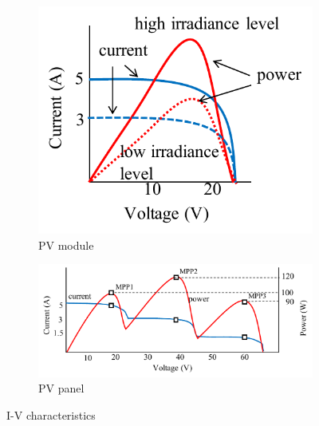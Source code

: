 \documentclass[conference]{IEEEtran}
\begin{document}
\begin{figure}
     \centering
    \begin{subfigure}[b]{0.5\linewidth}
        \centering
        \includegraphics[width=\linewidth]{fig/IV-module.pdf}
        \caption{PV module}
    \end{subfigure}
    \hfill
    \begin{subfigure}[b]{0.9\linewidth}
        \centering
        \vspace{3mm}
        \includegraphics[width=\linewidth]{fig/IV-panel.pdf}
        \caption{PV panel}
    \end{subfigure}
    \caption{I-V characteristics}
    \label{fig:IV}
\end{figure}
\end{document}
